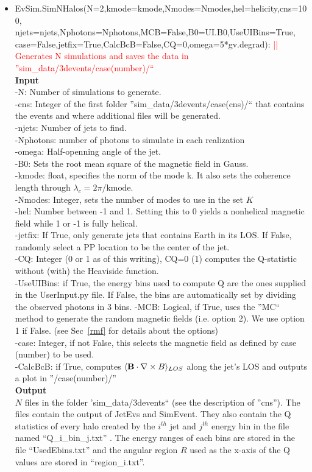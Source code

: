 \documentclass[article, superscriptaddress, ctexart, nofootinbib]{revtex4}
\newcommand{\tcr}{\textcolor{red}}
\begin{document}
\begin{itemize}
  \item{EvSim.SimNHalos(N=2,kmode=kmode,Nmodes=Nmodes,hel=helicity,cns=100,\\
  njets=njets,Nphotons=Nphotons,MCB=False,B0=UI.B0,UseUIBins=True,\\
  case=False,jetfix=True,CalcBcB=False,CQ=0,omega=5*gv.degrad):   \tcr{|| Generates N simulations and saves the data in ''sim\_data/3devents/case(number)/``}} \\
 {\bf{Input}}\\
 -N: Number of simulations to generate.\\
 -cns: Integer of the first folder ''sim\_data/3devents/case(cns)/`` that contains the events and where additional files will be generated.\\
 -njets: Number of jets to find.\\
 -Nphotons: number of photons to simulate in each realization\\
 -omega: Half-openning angle of the jet.\\
 -B0: Sets the root mean square of the magnetic field in Gauss.\\
 -kmode: float, specifies the norm of the mode k. It also sets the coherence length through $\lambda_c=2\pi/\text{kmode}$.\\
 -Nmodes: Integer, sets the number of modes to use in the set $K$\\
 -hel: Number between -1 and 1. Setting this to 0 yields a nonhelical magnetic field while 1 or -1 is fully helical.\\
 -jetfix: If True, only generate jets that contains Earth in its LOS. If False, randomly select a PP location to be the center of the jet.\\
 -CQ: Integer (0 or 1 as of this writing), CQ=0 (1) computes the Q-statistic without (with) the Heaviside function.\\
 -UseUIBins: if True, the energy bins used to compute Q are the ones supplied in the UserInput.py file. If False, the bins are automatically set by dividing the observed photons in 3 bins.
 -MCB: Logical, if True, uses the ''MC`` method to generate the random magnetic fields (i.e. option 2). We use option 1 if False. (see Sec~\ref{rmf} for details about the options)\\
 -case: Integer, if not False, this selects the magnetic field as defined by case (number) to be used. \\
 -CalcBcB: if True, computes $\langle {\bf B}\cdot \nabla \times B\rangle _{LOS}$ along the jet's LOS and outputs a plot in ''/case(number)/''\\
  {\bf{Output}}\\
 $N$ files in the folder  'sim\_data/3devents`` (see the description of ''cns''). The files contain the output of JetEvs and SimEvent. 
 They also contain the Q statistics of every halo created by the $i^{th}$ jet and $j^{th}$ energy bin in the file named ``Q\_i\_bin\_j.txt'' .
 The energy ranges of each bins are stored in the file ``UsedEbins.txt'' and the angular region $R$ used as the x-axis of the Q values are
 stored in ``region\_i.txt''.



\end{itemize}
\end{document}
